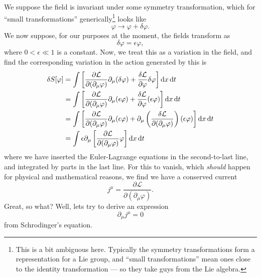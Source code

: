 \label{subsec:schrodinger:symmetry}
We suppose the field is invariant under some symmetry transformation,
which for ``small transformations'' generically\footnote{This is a bit
  ambiguous here. Typically the symmetry transformations form a
  representation for a Lie group, and ``small transformations'' mean
  ones close to the identity transformation --- so they take guys from
  the Lie algebra.} looks like
\begin{equation}
\varphi\to\varphi+\delta\varphi.
\end{equation}
We now suppose, for our purposes at the moment, the fields transform as
\begin{equation}
\delta\varphi=\epsilon\varphi,
\end{equation}
where $0<\epsilon\ll1$ is a constant.
Now, we treat this as a variation in the field, and find the
corresponding variation in the action generated by this is
\begin{subequations}
\begin{align}
\delta S[\varphi]
&=\int\left[\frac{\partial\mathcal{L}}{\partial(\partial_{\mu}\varphi)}
\partial_{\mu}(\delta\varphi)
+\frac{\delta\mathcal{L}}{\partial\varphi}\delta\varphi\right]\mathrm{d} x\,\mathrm{d} t\\
&=\int\left[\frac{\partial\mathcal{L}}{\partial(\partial_{\mu}\varphi)}
\partial_{\mu}(\epsilon\varphi)
+\frac{\delta\mathcal{L}}{\partial\varphi}(\epsilon\varphi)\right]\mathrm{d} x\,\mathrm{d} t\\
&=\int\left[\frac{\partial\mathcal{L}}{\partial(\partial_{\mu}\varphi)}
\partial_{\mu}(\epsilon\varphi)
+\partial_{\mu}\left(\frac{\delta\mathcal{L}}{\partial(\partial_{\mu}\varphi)}\right)(\epsilon\varphi)\right]\mathrm{d} x\,\mathrm{d} t\\
&=\int\epsilon\partial_{\mu}\left[
\frac{\partial\mathcal{L}}{\partial(\partial_{\mu}\varphi)}\varphi\right]\mathrm{d} x\,\mathrm{d} t
\end{align}
\end{subequations}
where we have inserted the Euler-Lagrange equations in the
second-to-last line, and integrated by parts in the last line. For this
to vanish, which \emph{should} happen for physical and mathematical
reasons, we find we have a conserved current
\begin{equation}
j^{\mu}=\frac{\partial\mathcal{L}}{\partial(\partial_{\mu}\varphi)}.
\end{equation}
Great, so what? Well, lets try to derive an expression
\begin{equation}
\partial_{\mu}j^{\mu}=0
\end{equation}
from Schrodinger's equation.

